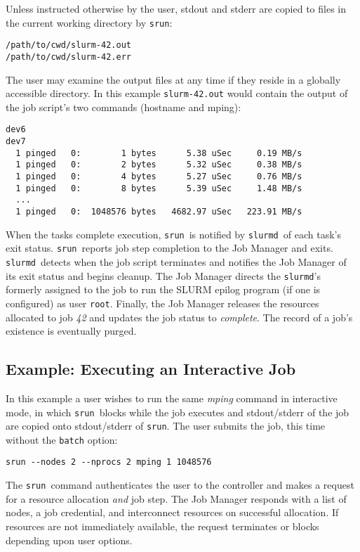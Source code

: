 \documentclass{article}
\newcommand{\srun}{{\tt srun}}
\newcommand{\slurmd}{{\tt slurmd}}
\begin{document}
Unless instructed otherwise by the user, stdout and stderr are
copied to files in the current working directory by \srun :

\begin{verbatim}
/path/to/cwd/slurm-42.out
/path/to/cwd/slurm-42.err
\end{verbatim}

The user may examine the output files at any time if they reside 
in a globally accessible directory. In this example
{\tt slurm-42.out} would  contain the output of the job script's two 
commands (hostname and mping):

\begin{verbatim}
dev6
dev7
  1 pinged   0:        1 bytes      5.38 uSec     0.19 MB/s                     
  1 pinged   0:        2 bytes      5.32 uSec     0.38 MB/s                     
  1 pinged   0:        4 bytes      5.27 uSec     0.76 MB/s                     
  1 pinged   0:        8 bytes      5.39 uSec     1.48 MB/s                     
  ...
  1 pinged   0:  1048576 bytes   4682.97 uSec   223.91 MB/s              
\end{verbatim}

When the tasks complete execution, \srun\ is notified by \slurmd\ of each
task's exit status. \srun\ reports job step completion to the Job Manager
and exits. 
\slurmd\ detects when the job script terminates and notifies
the Job Manager of its exit status and begins cleanup. 
The Job Manager directs the {\tt slurmd}'s formerly assigned to the
job to run the SLURM epilog program (if one is configured) as user 
{\tt root}. 
Finally, the Job Manager releases the resources allocated to job {\em 42}
and updates the job status to {\em complete}. The record of a job's
existence is eventually purged.

\subsection{Example:  Executing an Interactive Job}

In this example a user wishes to run the same {\em mping} command 
in interactive mode, in which \srun\ blocks while the job executes 
and stdout/stderr of the job are copied onto stdout/stderr of {\tt srun}.
The user submits the job, this time without the {\tt batch} option:
\begin{verbatim}
srun --nodes 2 --nprocs 2 mping 1 1048576
\end{verbatim}

The \srun\ command authenticates the user to the controller and
makes a request for a resource allocation {\em and} job step. The Job Manager
responds with a list of nodes, a job credential, and interconnect
resources on successful allocation. If resources are not immediately
available, the request terminates or blocks depending upon user
options.
\end{document}
